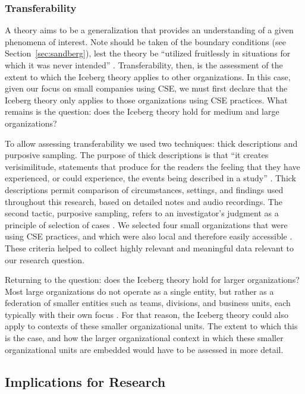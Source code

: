 \documentclass[smallextended]{svjour3}       %
\begin{document}
\subsubsection{Transferability}
A theory aims to be a generalization that provides an understanding of a given phenomena of interest. Note should be taken of the boundary conditions (see Section~\ref{sec:sandberg}), lest the theory be ``utilized fruitlessly in situations for which it was never intended'' \cite[p. 8]{miner1980}.
Transferability, then, is the assessment of the extent to which the Iceberg theory applies to other organizations. In this case, given our focus on small companies using CSE, we must first declare that the Iceberg theory only applies to those organizations using CSE practices. What remains is the question: does the Iceberg theory hold for medium and large organizations? 

To allow assessing transferability we used two techniques: thick descriptions \citep{geertz2008thick} and purposive sampling.
The purpose of thick descriptions is that ``it creates verisimilitude, statements that produce for the readers the feeling that they have experienced, or could experience, the events being described in a study'' \citep{creswell2000determining}. 
Thick descriptions permit comparison of circumstances, settings, and findings used throughout this research, based on detailed notes and audio recordings. 
The second tactic, purposive sampling, refers to an investigator's judgment as a principle of selection of cases \citep{robson2002}. We selected four small organizations that were using CSE practices, and which were also local and therefore easily accessible \citep{miles1994qualitative}. These criteria helped to collect highly relevant and meaningful data relevant to our research question.

Returning to the question: does the Iceberg theory hold for larger organizations? Most large organizations do not operate as a single entity, but rather as a federation of smaller entities such as teams, divisions, and business units, each typically with their own focus \citep{stol2011comparative}. For that reason, the Iceberg theory could also apply to contexts of these smaller organizational units. The extent to which this is the case, and how the larger organizational context in which these smaller organizational units are embedded would have to be assessed in more detail.



\subsection{Implications for Research}
\label{academic}
\end{document}
